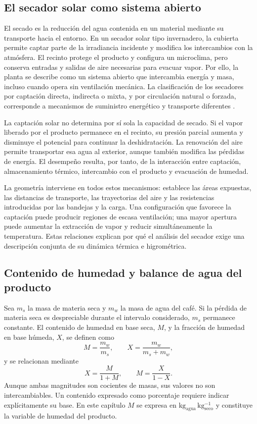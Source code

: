 \subsection{El secador solar como sistema abierto}

El secado es la reducción del agua contenida en un material mediante su transporte hacia el entorno. En un secador solar tipo invernadero, la cubierta permite captar parte de la irradiancia incidente y modifica los intercambios con la atmósfera. El recinto protege el producto y configura un microclima, pero conserva entradas y salidas de aire necesarias para evacuar vapor. Por ello, la planta se describe como un sistema abierto que intercambia energía y masa, incluso cuando opera sin ventilación mecánica. La clasificación de los secadores por captación directa, indirecta o mixta, y por circulación natural o forzada, corresponde a mecanismos de suministro energético y transporte diferentes \cite{fudholi2010}.

La captación solar no determina por sí sola la capacidad de secado. Si el vapor liberado por el producto permanece en el recinto, su presión parcial aumenta y disminuye el potencial para continuar la deshidratación. La renovación del aire permite transportar esa agua al exterior, aunque también modifica las pérdidas de energía. El desempeño resulta, por tanto, de la interacción entre captación, almacenamiento térmico, intercambio con el producto y evacuación de humedad.

La geometría interviene en todos estos mecanismos: establece las áreas expuestas, las distancias de transporte, las trayectorias del aire y las resistencias introducidas por las bandejas y la carga. Una configuración que favorece la captación puede producir regiones de escasa ventilación; una mayor apertura puede aumentar la extracción de vapor y reducir simultáneamente la temperatura. Estas relaciones explican por qué el análisis del secador exige una descripción conjunta de su dinámica térmica e higrométrica.

\subsection{Contenido de humedad y balance de agua del producto}
\label{subsec:humedad_producto}

Sea $m_s$ la masa de materia seca y $m_w$ la masa de agua del café. Si la pérdida de materia seca es despreciable durante el intervalo considerado, $m_s$ permanece constante. El contenido de humedad en base seca, $M$, y la fracción de humedad en base húmeda, $X$, se definen como
\begin{equation}
M=\frac{m_w}{m_s},
\qquad
X=\frac{m_w}{m_s+m_w},
\label{eq:humedad_bases}
\end{equation}
y se relacionan mediante
\begin{equation}
X=\frac{M}{1+M},
\qquad
M=\frac{X}{1-X}.
\label{eq:conversion_humedad}
\end{equation}
Aunque ambas magnitudes son cocientes de masas, sus valores no son intercambiables. Un contenido expresado como porcentaje requiere indicar explícitamente su base. En este capítulo $M$ se expresa en $\mathrm{kg_{agua}\,kg_{seco}^{-1}}$ y constituye la variable de humedad del producto.

